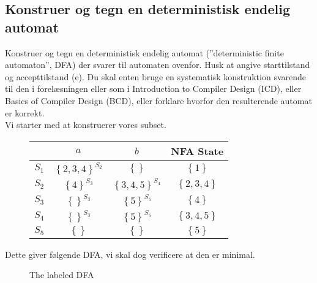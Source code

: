 \documentclass[11pt,a4paper]{article}
\begin{document}
\subsection{Konstruer og tegn en deterministisk endelig automat}
Konstruer og tegn en deterministisk endelig automat (''deterministic finite automaton'', DFA) der svarer til automaten ovenfor. Husk at angive starttilstand og accepttilstand (e). Du skal enten bruge en systematisk konstruktion svarende til den i forelæsningen eller som i Introduction to Compiler Design (ICD), eller Basics of Compiler Design (BCD), eller forklare hvorfor den resulterende automat er korrekt.\\
Vi starter med at konstruerer vores subset.
\newpage
\begin{figure}[!ht]\label{fig:nfa2dfa}
  \centering
  \begin{tabular}{c|ccc}
          & $a$ & $b$ & NFA State\\\hline
    $S_1$ & $\left\{2, 3,4\right\}^{S_2}$ & $\left\{\right\}$ & $\left\{1\right\}$ \\
    $S_2$ & $\left\{4\right\}^{S_3}$ & $\left\{3,4,5\right\}^{S_4}$ & $\left\{2,3,4\right\}$\\
    $S_3$ & $\left\{\right\}^{S_3}$ & $\left\{5\right\}^{S_5}$ & $\left\{4\right\}$\\
    $S_4$ & $\left\{\right\}^{S_3}$ & $\left\{5\right\}^{S_5}$ & $\left\{3,4,5\right\}$\\
    $S_5$ & $\left\{\right\}$ & $\left\{\right\}$ & $\left\{5\right\}$
  \end{tabular}
\end{figure}
\noindent Dette giver følgende DFA, vi skal dog verificere at den er minimal.
\begin{figure}[!ht]\label{fig:examfigdfa}
    \centering
    \caption{The labeled DFA}
\end{figure}\\
\end{document}
